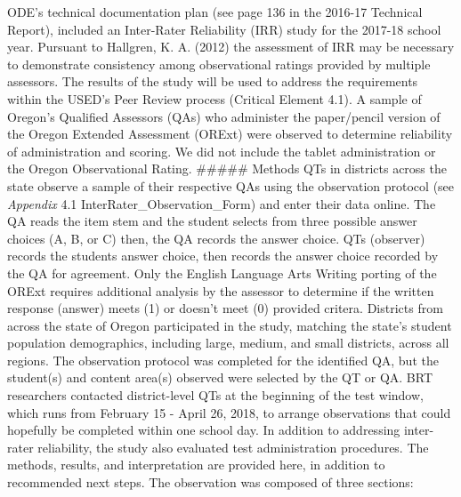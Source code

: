 \documentclass[]{article}
\begin{document}
ODE's technical documentation plan (see page 136 in the 2016-17
Technical Report), included an Inter-Rater Reliability (IRR) study for
the 2017-18 school year. Pursuant to Hallgren, K. A. (2012) the
assessment of IRR may be necessary to demonstrate consistency among
observational ratings provided by multiple assessors. The results of the
study will be used to address the requirements within the USED's Peer
Review process (Critical Element 4.1). A sample of Oregon's Qualified
Assessors (QAs) who administer the paper/pencil version of the Oregon
Extended Assessment (ORExt) were observed to determine reliability of
administration and scoring. We did not include the tablet administration
or the Oregon Observational Rating. \#\#\#\#\# Methods QTs in districts
across the state observe a sample of their respective QAs using the
observation protocol (see \emph{Appendix} 4.1
InterRater\_Observation\_Form) and enter their data online. The QA reads
the item stem and the student selects from three possible answer choices
(A, B, or C) then, the QA records the answer choice. QTs (observer)
records the students answer choice, then records the answer choice
recorded by the QA for agreement. Only the English Language Arts Writing
porting of the ORExt requires additional analysis by the assessor to
determine if the written response (answer) meets (1) or doesn't meet (0)
provided critera. Districts from across the state of Oregon participated
in the study, matching the state's student population demographics,
including large, medium, and small districts, across all regions. The
observation protocol was completed for the identified QA, but the
student(s) and content area(s) observed were selected by the QT or QA.
BRT researchers contacted district-level QTs at the beginning of the
test window, which runs from February 15 - April 26, 2018, to arrange
observations that could hopefully be completed within one school day. In
addition to addressing inter-rater reliability, the study also evaluated
test administration procedures. The methods, results, and interpretation
are provided here, in addition to recommended next steps. The
observation was composed of three sections:
\end{document}

